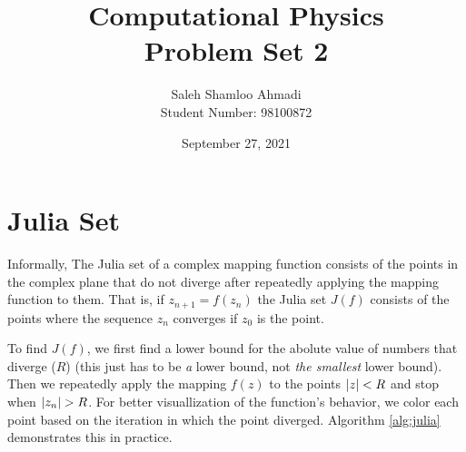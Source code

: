 \documentclass[12pt,a4paper]{article}
\title{Computational Physics\\Problem Set 2}
\author{Saleh Shamloo Ahmadi\\Student Number: 98100872}
\date{September 27, 2021}
\begin{document}
	\maketitle
    \section{Julia Set}
    Informally, The Julia set of a complex mapping function consists of the points in the complex plane that
    do not diverge after repeatedly applying the mapping function to them. That is, if $z_{n + 1} = f(z_n)$ the
    Julia set $J(f)$ consists of the points where the sequence $z_n$ converges if $z_0$ is the point.

    To find $J(f)$, we first find a lower bound for the abolute value of numbers that diverge ($R$)
    (this just has to be \emph{a} lower bound, not \emph{the smallest} lower bound). Then we repeatedly apply
    the mapping $f(z)$ to the points $\abs{z} < R$ and stop when $\abs{z_n} > R$. For better visuallization of
    the function's behavior, we color each point based on the iteration in which the point diverged.
    Algorithm \ref{alg:julia} demonstrates this in practice.
\end{document}
